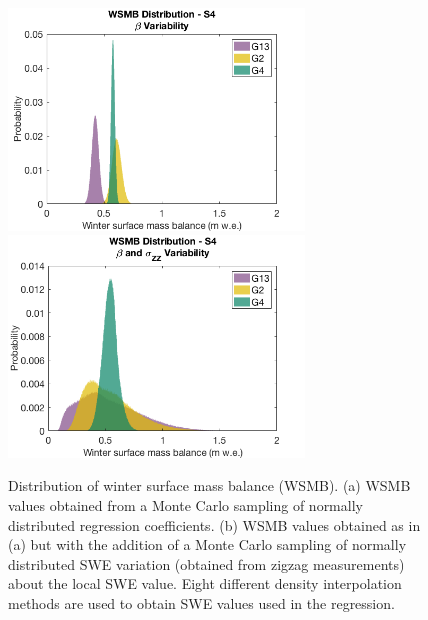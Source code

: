 \documentclass[12pt]{article}
\begin{document}
\begin{figure}[H]
	\centering
	\includegraphics[width =0.7\textwidth]{WSMB_beta.png}\\
	\includegraphics[width =0.7\textwidth]{WSMB_betaNsigmaZZ.png}\\
	\caption{Distribution of winter surface mass balance (WSMB). (a)  WSMB values obtained from a Monte Carlo sampling of normally distributed regression coefficients. (b) WSMB values obtained as in (a) but with the addition of a Monte Carlo sampling of normally distributed SWE variation (obtained from zigzag measurements) about the local SWE value. Eight different density interpolation methods are used to obtain SWE values used in the regression.}
	\label{fig:WSMB_oneDensity}
\end{figure}
\end{document}
